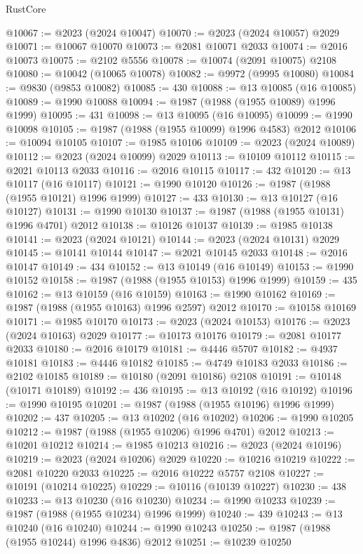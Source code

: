 \begin{lexlean}{RustCore}
\begin{coremodule}
@10067 := @2023 (@2024 @10047)
@10070 := @2023 (@2024 @10057) @2029
@10071 := @10067 @10070
@10073 := @2081 @10071 @2033
@10074 := @2016 @10073
@10075 := @2102 @5556
@10078 := @10074 (@2091 @10075) @2108
@10080 := @10042 (@10065 @10078)
@10082 := @9972 (@9995 @10080)
@10084 := @9830 (@9853 @10082)
@10085 := 430
@10088 := @13 @10085 (@16 @10085)
@10089 := @1990 @10088
@10094 := @1987 (@1988 (@1955 @10089) @1996 @1999)
@10095 := 431
@10098 := @13 @10095 (@16 @10095)
@10099 := @1990 @10098
@10105 := @1987 (@1988 (@1955 @10099) @1996 @4583) @2012
@10106 := @10094 @10105
@10107 := @1985 @10106
@10109 := @2023 (@2024 @10089)
@10112 := @2023 (@2024 @10099) @2029
@10113 := @10109 @10112
@10115 := @2021 @10113 @2033
@10116 := @2016 @10115
@10117 := 432
@10120 := @13 @10117 (@16 @10117)
@10121 := @1990 @10120
@10126 := @1987 (@1988 (@1955 @10121) @1996 @1999)
@10127 := 433
@10130 := @13 @10127 (@16 @10127)
@10131 := @1990 @10130
@10137 := @1987 (@1988 (@1955 @10131) @1996 @4701) @2012
@10138 := @10126 @10137
@10139 := @1985 @10138
@10141 := @2023 (@2024 @10121)
@10144 := @2023 (@2024 @10131) @2029
@10145 := @10141 @10144
@10147 := @2021 @10145 @2033
@10148 := @2016 @10147
@10149 := 434
@10152 := @13 @10149 (@16 @10149)
@10153 := @1990 @10152
@10158 := @1987 (@1988 (@1955 @10153) @1996 @1999)
@10159 := 435
@10162 := @13 @10159 (@16 @10159)
@10163 := @1990 @10162
@10169 := @1987 (@1988 (@1955 @10163) @1996 @2597) @2012
@10170 := @10158 @10169
@10171 := @1985 @10170
@10173 := @2023 (@2024 @10153)
@10176 := @2023 (@2024 @10163) @2029
@10177 := @10173 @10176
@10179 := @2081 @10177 @2033
@10180 := @2016 @10179
@10181 := @4446 @5707
@10182 := @4937 @10181
@10183 := @4446 @10182
@10185 := @4749 @10183 @2033
@10186 := @2102 @10185
@10189 := @10180 (@2091 @10186) @2108
@10191 := @10148 (@10171 @10189)
@10192 := 436
@10195 := @13 @10192 (@16 @10192)
@10196 := @1990 @10195
@10201 := @1987 (@1988 (@1955 @10196) @1996 @1999)
@10202 := 437
@10205 := @13 @10202 (@16 @10202)
@10206 := @1990 @10205
@10212 := @1987 (@1988 (@1955 @10206) @1996 @4701) @2012
@10213 := @10201 @10212
@10214 := @1985 @10213
@10216 := @2023 (@2024 @10196)
@10219 := @2023 (@2024 @10206) @2029
@10220 := @10216 @10219
@10222 := @2081 @10220 @2033
@10225 := @2016 @10222 @5757 @2108
@10227 := @10191 (@10214 @10225)
@10229 := @10116 (@10139 @10227)
@10230 := 438
@10233 := @13 @10230 (@16 @10230)
@10234 := @1990 @10233
@10239 := @1987 (@1988 (@1955 @10234) @1996 @1999)
@10240 := 439
@10243 := @13 @10240 (@16 @10240)
@10244 := @1990 @10243
@10250 := @1987 (@1988 (@1955 @10244) @1996 @4836) @2012
@10251 := @10239 @10250

\end{coremodule}
\end{lexlean}
